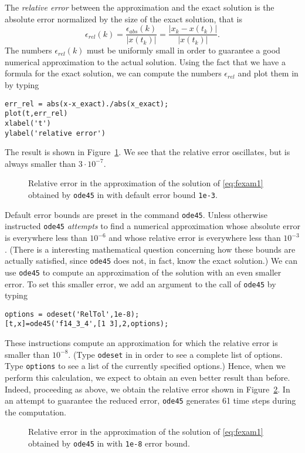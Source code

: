 \documentclass{ximera}
\begin{document}
The {\em relative error\/} between 
the approximation and the exact solution is the absolute error normalized by 
the size of the exact solution, that is  
\[
\epsilon_{rel}(k) = \frac{\epsilon_{abs}(k)}{|x(t_k)|} 
= \frac{|x_k - x(t_k)|}{|x(t_k)|}.
\]
The numbers $\epsilon_{rel}(k)$ must be uniformly small in order to guarantee
a good numerical approximation to the actual solution.  Using the fact
that we have a formula for the exact solution, we can compute the numbers 
$\epsilon_{rel}$ and plot them in \Matlab by typing
\begin{verbatim}
err_rel = abs(x-x_exact)./abs(x_exact);
plot(t,err_rel)
xlabel('t')
ylabel('relative error')
\end{verbatim} 
The result is shown in Figure~\ref{fig:ode45err1}.  We see that the relative 
error oscillates, but is always smaller than $3\cdot 10^{-7}$.
\begin{figure}[htb]
   \centerline{%
   }
   \caption{Relative error in the approximation of the solution of
   \protect\eqref{eq:fexam1} obtained by {\tt ode45} in \protect\Matlab with 
	default error bound {\tt 1e-3}.}
   \label{fig:ode45err1}
\end{figure}

Default error bounds are preset in the command {\tt ode45}.  Unless otherwise
instructed {\tt ode45} {\em attempts\/} to find a numerical approximation 
whose absolute error is everywhere less than $10^{-6}$ and whose relative 
error is everywhere less than $10^{-3}$.  (There is a interesting mathematical
question concerning how these bounds are actually satisfied, since 
{\tt ode45} does not, in fact, know the exact solution.)  We can use 
{\tt ode45} to compute an approximation of the solution with an even smaller 
error.  To set this smaller error, we add an argument to the call of 
{\tt ode45} by typing 
\begin{verbatim}
options = odeset('RelTol',1e-8);
[t,x]=ode45('f14_3_4',[1 3],2,options);
\end{verbatim}
These instructions compute an approximation for which the relative error 
 is smaller than $10^{-8}$.  
(Type {\tt odeset} in \Matlab in order to see a 
complete list of options. Type {\tt options} to see a list of the currently
specified options.)  Hence, when we perform 
this calculation, we expect to obtain an even better result than before.  
Indeed, proceeding as above, we obtain the relative error shown 
in Figure~\ref{fig:ode45err2}.  In an attempt to guarantee the reduced error, 
{\tt ode45} generates 61 time steps during the computation.  

\begin{figure}[htb]
   \centerline{%
   }
   \caption{Relative error in the approximation of the solution of
   \protect\eqref{eq:fexam1} obtained by {\tt ode45} in \protect\Matlab with 
	{\tt 1e-8} error bound.}
   \label{fig:ode45err2}
\end{figure}



\end{document}

